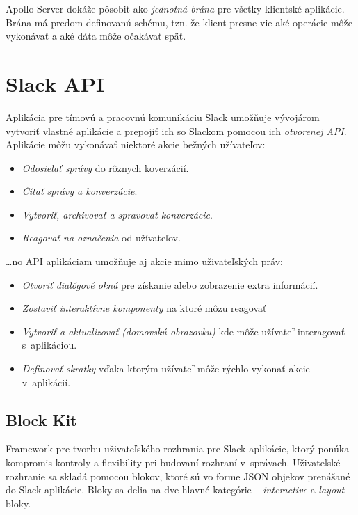 \noindent Apollo Server dokáže pôsobiť ako \emph{jednotná brána} pre všetky klientské aplikácie. Brána má predom definovanú schému, tzn. že klient presne vie aké operácie môže vykonávať a aké dáta môže očakávať späť.

\section{Slack API}
\label{theory:slack_api}
Aplikácia pre tímovú a pracovnú komunikáciu Slack umožňuje vývojárom vytvoriť vlastné aplikácie a prepojiť ich so Slackom pomocou ich \emph{otvorenej API}. \cite{SlackAPI} \\

\noindent Aplikácie môžu vykonávať niektoré akcie bežných užívateľov:

\begin{itemize}
	\item \emph{Odosielať správy} do rôznych koverzácií. \cite{SlackAPI}
	\item \emph{Čítať správy a konverzácie}. \cite{SlackAPI}
	\item \emph{Vytvoriť, archivovať a spravovať konverzácie}. \cite{SlackAPI}
	\item \emph{Reagovať na označenia} od užívateľov. \cite{SlackAPI}
\end{itemize}

\ldots no API aplikáciam umožňuje aj akcie mimo uživateľských práv:

\begin{itemize}
	\item \emph{Otvoriť dialógové okná} pre získanie alebo zobrazenie extra informácií. \cite{SlackAPI}
	\item \emph{Zostaviť interaktívne komponenty} na ktoré môzu reagovať \cite{SlackAPI}
	\item \emph{Vytvoriť a aktualizovať  (domovskú obrazovku)} kde môže užívateľ interagovať s~aplikáciou. \cite{SlackAPI}
	\item \emph{Definovať skratky} vďaka ktorým užívateľ môže rýchlo vykonať akcie v~aplikácií. \cite{SlackAPI}
\end{itemize}

\subsection{Block Kit}
Framework pre tvorbu uživateľského rozhrania pre Slack aplikácie, ktorý ponúka kompromis kontroly a flexibility pri budovaní rozhraní v~správach. \cite{SlackAPI}  Uživateľské rozhranie sa skladá pomocou blokov, ktoré sú vo forme JSON objekov prenášané do Slack aplikácie. Bloky sa delia na dve hlavné kategórie -- \emph{interactive} a \emph{layout} bloky. \\

